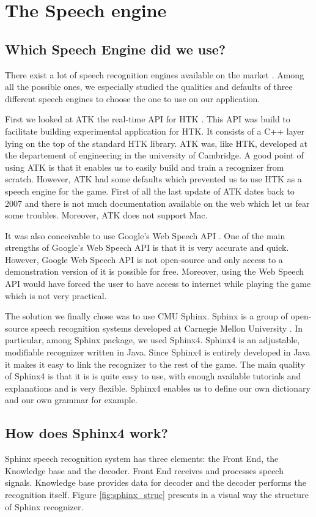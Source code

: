 \section*{The Speech engine}
\subsection*{Which Speech Engine did we use?}
There exist a lot of speech recognition engines available on the market \cite{list_rec_soft}. Among all the possible ones, we especially studied the qualities and defaults of three different speech engines to choose the one to use on our application. 

First we looked at ATK the real-time API for HTK \cite{atk}. This API was build to facilitate building experimental application for HTK. It consists of a C++ layer lying on the top of the standard HTK library. ATK was, like HTK, developed at the departement of engineering in the university of Cambridge. A good point of using ATK is that it enables us to easily build and train a recognizer from scratch. However, ATK had some defaults which prevented us to use HTK as a speech engine for the game. First of all the last update of ATK dates back to 2007 and there is not much documentation available on the web which let us fear some troubles. Moreover, ATK does not support Mac. 

It was also conceivable to use Google's Web Speech API \cite{google_speech_api}. One of the main strengths of Google's Web Speech API is that it is very accurate and quick. However, Google Web Speech API is not open-source and only access to a demonstration version of it is possible for free. Moreover, using the Web Speech API would have forced  the user to have access to internet while playing the game which is not very practical. 

The solution we finally chose was to use CMU Sphinx. Sphinx is a group of open-source speech recognition systems developed at Carnegie Mellon University \cite{sphinx}. In particular, among Sphinx package, we used Sphinx4. Sphinx4 is an adjustable, modifiable recognizer written in Java. Since Sphinx4 is entirely developed in Java it makes it easy to link the recognizer to the rest of the game. The main quality of Sphinx4 is that it is is quite easy to use, with enough available tutorials and explanations and is very flexible. Sphinx4 enables us to define our own dictionary and our own grammar for example. 

\subsection*{How does Sphinx4 work?}
Sphinx speech recognition system has three elements: the Front End, the Knowledge base and the decoder. Front End receives and processes speech signals. Knowledge base provides data for decoder and the decoder performs the recognition itself. Figure \ref{fig:sphinx_struc} presents in a visual way the structure of Sphinx recognizer. 


